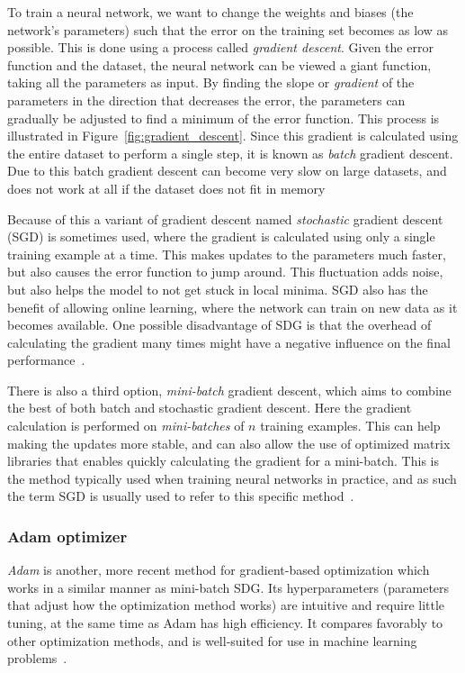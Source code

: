 \documentclass{kththesis}
\begin{document}
To train a neural network, we want to change the weights and biases (the network's parameters) such that the error on the training set becomes as low as possible. This is done using a process called \textit{gradient descent}. Given the error function and the dataset, the neural network can be viewed a giant function, taking all the parameters as input. By finding the slope or \textit{gradient} of the parameters in the direction that decreases the error, the parameters can gradually be adjusted to find a minimum of the error function. This process is illustrated in Figure~\ref{fig:gradient_descent}. Since this gradient is calculated using the entire dataset to perform a single step, it is known as \textit{batch} gradient descent. Due to this batch gradient descent can become very slow on large datasets, and does not work at all if the dataset does not fit in memory~\cite{gradient_descent}

Because of this a variant of gradient descent named \textit{stochastic} gradient descent (SGD) is sometimes used, where the gradient is calculated using only a single training example at a time. This makes updates to the parameters much faster, but also causes the error function to jump around. This fluctuation adds noise, but also helps the model to not get stuck in local minima. SGD also has the benefit of allowing online learning, where the network can train on new data as it becomes available. One possible disadvantage of SDG is that the overhead of calculating the gradient many times might have a negative influence on the final performance~\cite{gradient_descent}.

There is also a third option, \textit{mini-batch} gradient descent, which aims to combine the best of both batch and stochastic gradient descent. Here the gradient calculation is performed on \textit{mini-batches} of $n$ training examples. This can help making the updates more stable, and can also allow the use of optimized matrix libraries that enables quickly calculating the gradient for a mini-batch. This is the method typically used when training neural networks in practice, and as such the term SGD is usually used to refer to this specific method~\cite{gradient_descent}.

\subsubsection{Adam optimizer}
\textit{Adam} is another, more recent method for gradient-based optimization which works in a similar manner as mini-batch SDG. Its hyperparameters (parameters that adjust how the optimization method works) are intuitive and require little tuning, at the same time as Adam has high efficiency. It compares favorably to other optimization methods, and is well-suited for use in machine learning problems~\cite{adam}.
\end{document}
